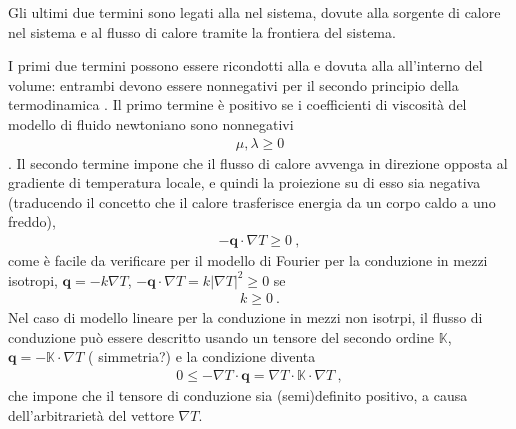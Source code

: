 \documentclass[letterpaper,10pt,english]{jupyterBook}
\begin{document}
\begin{itemize}
\sphinxAtStartPar
Gli ultimi due termini sono legati alla  nel sistema, dovute alla sorgente di calore nel sistema e al flusso di calore tramite la frontiera del sistema.

\sphinxAtStartPar
I primi due termini possono essere ricondotti alla  e dovuta alla  all’interno del volume: entrambi devono essere non\sphinxhyphen{}negativi per il secondo principio della termodinamica . Il primo termine è positivo se i coefficienti di viscosità del modello di fluido newtoniano sono non\sphinxhyphen{}negativi
\begin{equation*}
\begin{split}\mu, \lambda \ge 0\end{split}
\end{equation*}
\sphinxAtStartPar
. Il secondo termine impone che il flusso di calore avvenga in direzione opposta al gradiente di temperatura locale, e quindi la proiezione su di esso sia negativa (traducendo il concetto che il calore trasferisce energia da un corpo caldo a uno freddo),
\begin{equation*}
\begin{split}- \mathbf{q} \cdot \nabla T \ge 0 \ ,\end{split}
\end{equation*}
\sphinxAtStartPar
come è facile da verificare per il modello di Fourier per la conduzione in mezzi isotropi, \(\mathbf{q} = - k \nabla T\), \(- \mathbf{q} \cdot \nabla T = k |\nabla T|^2 \ge 0\) se
\begin{equation*}
\begin{split}k \ge 0 \ .\end{split}
\end{equation*}
\sphinxAtStartPar
Nel caso di modello lineare per la conduzione in mezzi non isotrpi, il flusso di conduzione può essere descritto usando un tensore del secondo ordine \(\mathbb{K}\), \(\mathbf{q} = - \mathbb{K} \cdot \nabla T\) ( simmetria?) e la condizione diventa
\begin{equation*}
\begin{split}0 \le - \nabla T  \cdot \mathbf{q} = \nabla T \cdot \mathbb{K} \cdot \nabla T \ ,\end{split}
\end{equation*}
\sphinxAtStartPar
che impone che il tensore di conduzione sia (semi\sphinxhyphen{})definito positivo, a causa dell’arbitrarietà del vettore \(\nabla T\).


\end{itemize}
\end{document}
